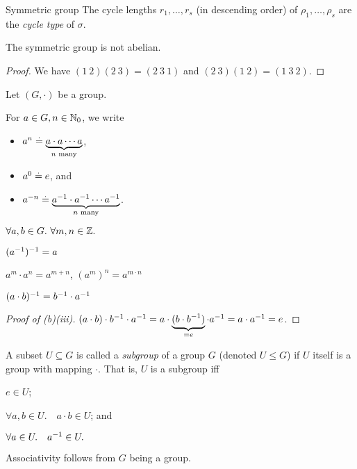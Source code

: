 \begin{ex}{Symmetric group}{}
The cycle lengths $r_1, \dots, r_s$ (in descending order) of $\rho_1, \dots, \rho_s$ are the \emph{cycle type} of $\sigma$.

\begin{rmk}
The symmetric group is not abelian.
\end{rmk}\vspace{-20pt}\begin{proof}
We have $(1\ 2)(2\ 3) = (2\ 3\ 1)$ and $(2\ 3)(1\ 2) = (1\ 3\ 2)$.
\end{proof}
\end{ex}

\begin{lem}
Let $(G,\cdot)$ be a group. \begin{lemlist}
    \item For $a \in G, n \in \mathbb{N}_0$, we write \begin{itemize}
        \item $a^n \overset{.}{=} \underbrace{a \cdot a \cdots a}_{\text{$n$ many}}$,
        \item $a^0 \overset{.}{=} e$, and
        \item $a^{-n} \overset{.}{=} \underbrace{a^{-1} \cdot a^{-1} \cdots a^{-1}}_{\text{$n$ many}}$.
    \end{itemize}
    
    \item $\forall a, b \in G.\ \forall m, n \in \mathbb{Z}.$ \begin{nestedlemlist}
        \item $(a^{-1})^{-1} = a$
        \item $a^m \cdot a^n = a^{m+n}$, $(a^m)^n = a^{m \cdot n}$
        \item $(a \cdot b)^{-1} = b^{-1} \cdot a^{-1}$
    \end{nestedlemlist}
\end{lemlist}
\end{lem}
\begin{proof}[Proof of (b)(iii)] $(a \cdot b) \cdot b^{-1} \cdot a^{-1} = a \cdot \underbrace{(b \cdot b^{-1})}_{=e} \cdot a^{-1} = a \cdot a^{-1} = e$.
\end{proof}

\begin{defn}[Subgroup]
A subset $U \subseteq G$ is called a \emph{subgroup} of a group $G$ (denoted $U \leq G$) if $U$ itself is a group with mapping $\cdot$. That is, $U$ is a subgroup iff \begin{defnlist}
    \item $e \in U$; 
    \item $\forall a, b \in U.\quad a \cdot b \in U$; and 
    \item $\forall a \in U.\quad a^{-1} \in U.$ 
\end{defnlist} Associativity follows from $G$ being a group.
\end{defn}

